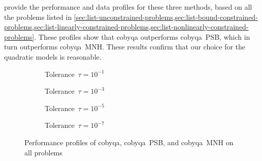  provide the performance and data profiles for these three methods, based on all the problems listed in \cref{sec:list-unconstrained-problems,sec:list-bound-constrained-problems,sec:list-linearly-constrained-problems,sec:list-nonlinearly-constrained-problems}.
These profiles show that \gls{cobyqa} outperforms \gls{cobyqa}~PSB, which in turn outperforms \gls{cobyqa}~MNH.
These results confirm that our choice for the quadratic models is reasonable.

\begin{figure}[ht]
    \centering
    \begin{subfigure}[b]{0.49\textwidth}
        \centering
        \caption{Tolerance~$\tau = 10^{-1}$}
    \end{subfigure}
    \hfill
    \begin{subfigure}[b]{0.49\textwidth}
        \centering
        \caption{Tolerance~$\tau = 10^{-3}$}
    \end{subfigure}
    \begin{subfigure}[b]{0.49\textwidth}
        \centering
        \caption{Tolerance~$\tau = 10^{-5}$}
    \end{subfigure}
    \hfill
    \begin{subfigure}[b]{0.49\textwidth}
        \centering
        \caption{Tolerance~$\tau = 10^{-7}$}
    \end{subfigure}
    \caption[Performance profiles with different models]{Performance profiles of \gls{cobyqa}, \gls{cobyqa}~PSB, and \gls{cobyqa}~MNH on all problems}
    \label{fig:perf-models}
\end{figure}

